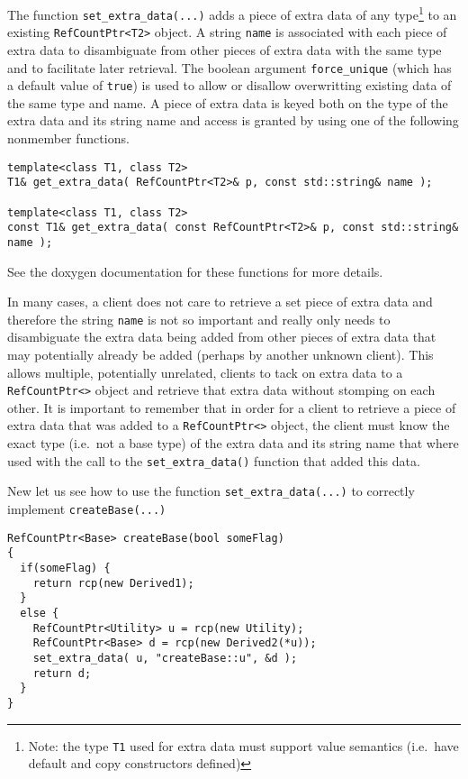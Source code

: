 The function {}\texttt{set\-\_extra\-\_data(...)} adds a piece of
extra data of any type\footnote{Note: the type {}\texttt{T1} used for
extra data must support value semantics (i.e.~have default and copy
constructors defined)} to an existing {}\texttt{RefCountPtr<T2>}
object.  A string \texttt{name} is associated with each piece of extra
data to disambiguate from other pieces of extra data with the same
type and to facilitate later retrieval.  The boolean argument
\texttt{force\-\_unique} (which has a default value of \texttt{true})
is used to allow or disallow overwritting existing data of the same
type and name.  A piece of extra data is keyed both on the type of the
extra data and its string name and access is granted by using one of
the following nonmember functions.

{\scriptsize\begin{verbatim}
template<class T1, class T2>
T1& get_extra_data( RefCountPtr<T2>& p, const std::string& name );

template<class T1, class T2>
const T1& get_extra_data( const RefCountPtr<T2>& p, const std::string& name );
\end{verbatim}}

{}\noindent{} See the doxygen documentation for these functions for
more details.

In many cases, a client does not care to retrieve a set piece of extra
data and therefore the string \texttt{name} is not so important and
really only needs to disambiguate the extra data being added from
other pieces of extra data that may potentially already be added
(perhaps by another unknown client).  This allows multiple,
potentially unrelated, clients to tack on extra data to a
{}\texttt{RefCountPtr<>} object and retrieve that extra data without
stomping on each other.  It is important to remember that in order for
a client to retrieve a piece of extra data that was added to a
{}\texttt{RefCountPtr<>} object, the client must know the exact type
(i.e.~not a base type) of the extra data and its string name that
where used with the call to the {}\texttt{set\-\_extra\-\_data()}
function that added this data.

New let us see how to use the function {}\texttt{set\-\_extra\-\_data(...)}
to correctly implement {}\texttt{create\-Base(...)}

{\scriptsize\begin{verbatim}
RefCountPtr<Base> createBase(bool someFlag)
{
  if(someFlag) {
    return rcp(new Derived1);
  }
  else {
    RefCountPtr<Utility> u = rcp(new Utility);
    RefCountPtr<Base> d = rcp(new Derived2(*u));
    set_extra_data( u, "createBase::u", &d );
    return d;
  }
}
\end{verbatim}}

